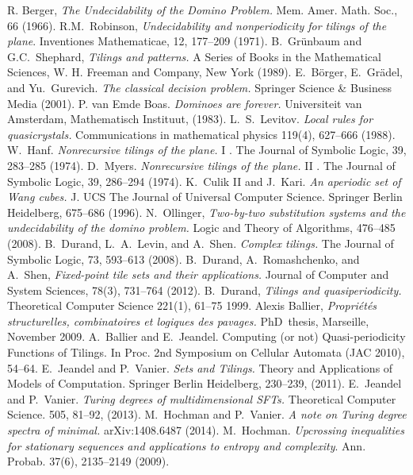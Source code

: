 \documentclass[runningheads]{llncs}
\begin{document}
\begin{thebibliography}{19}
 R. Berger, \emph{The Undecidability of the Domino Problem.} Mem. Amer. Math. Soc., 66 (1966).
 R.M.~Robinson, \emph{Undecidability and nonperiodicity for tilings of the plane}. Inventiones Mathematicae, 12, 177--209 (1971).
 B.~Gr\"unbaum and G.C.~Shephard, \emph{Tilings and patterns.} A Series of Books in the Mathematical Sciences, W. H. Freeman and Company, New York (1989). E.~B\"orger,  E.~Gr\"adel, and Yu.~Gurevich. \emph{The classical decision problem.} Springer Science \& Business Media (2001).
 P. van Emde Boas. \emph{Dominoes are forever.}  Universiteit van Amsterdam, Mathematisch Instituut, (1983).
 L.~S.~Levitov. \emph{Local rules for quasicrystals.}  Communications in mathematical physics 119(4),  627--666 (1988).
  W.~Hanf. \emph{Nonrecursive tilings of the plane.} I . The Journal of Symbolic Logic,  39, 283--285 (1974). 
  D.~Myers. \emph{Nonrecursive tilings of the plane.} II . The Journal of Symbolic Logic,  39,  286--294 (1974).  
 K.~Culik II and J.~Kari. \emph{An aperiodic set of Wang cubes.} J. UCS The Journal of Universal Computer Science. Springer Berlin Heidelberg,  675--686 (1996).
 N.~Ollinger, \emph{Two-by-two substitution systems and the undecidability of the domino problem.}
Logic and Theory of Algorithms, 476--485 (2008).
 B.~Durand, L.~A.~Levin, and A.~Shen. \emph{Complex tilings.} The Journal of Symbolic Logic, 73,  593--613 (2008).
 B.~Durand, A.~Romashchenko, and A.~Shen, \emph{Fixed-point tile sets and their applications.}
Journal of Computer and System Sciences, 78(3), 731--764 (2012).
 B.~Durand, \emph{Tilings and quasiperiodicity.}  Theoretical Computer Science 221(1),  61--75 1999.
 Alexis Ballier, \emph{Propri\'et\'es structurelles, combinatoires et logiques des pavages.} PhD~thesis, Marseille, November 2009.
 A.~Ballier and E.~Jeandel. Computing (or not) Quasi-periodicity Functions of Tilings. In Proc. 
2nd Symposium on Cellular Automata (JAC 2010), 54--64. 
  E.~Jeandel and P.~Vanier. \emph{ Sets and Tilings.} Theory and Applications of Models of Computation. Springer Berlin Heidelberg,  230--239, (2011).
 E.~Jeandel and P.~Vanier. \emph{Turing degrees of multidimensional SFTs.}  Theoretical Computer Science. 505, 81--92, (2013).
 M.~Hochman and P.~Vanier. \emph{A note on Turing degree spectra of minimal.}  arXiv:1408.6487 (2014). 
 M.~Hochman. \emph{Upcrossing inequalities for stationary sequences and applications to entropy and complexity}.
Ann. Probab. 37(6), 2135--2149 (2009).
\end{thebibliography}
\end{document}
